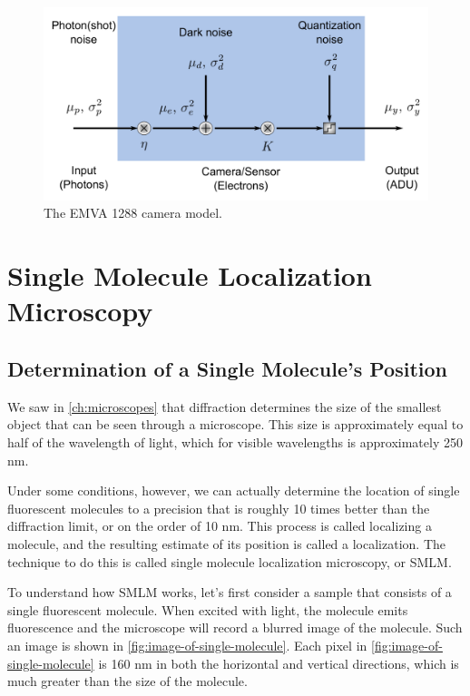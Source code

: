 \documentclass[10pt,a4paper,oneside]{book}
\begin{document}
\begin{figure}[ht]
    \centering
    \includegraphics[width=1.0\textwidth]{camera_noise_model.png}
    \caption{The EMVA 1288 camera model.}
    \label{fig:camera-model}
\end{figure}

\chapter{Single Molecule Localization Microscopy}

\section{Determination of a Single Molecule's Position}

We saw in \autoref{ch:microscopes} that diffraction determines the size of the smallest object that can be seen through a microscope. This size is approximately equal to half of the wavelength of light, which for visible wavelengths is approximately 250 nm.

Under some conditions, however, we can actually determine the location of single fluorescent molecules to a precision that is roughly 10 times better than the diffraction limit, or on the order of 10 nm. This process is called localizing a molecule, and the resulting estimate of its position is called a localization. The technique to do this is called single molecule localization microscopy, or SMLM.

To understand how SMLM works, let's first consider a sample that consists of a single fluorescent molecule. When excited with light, the molecule emits fluorescence and the microscope will record a blurred image of the molecule. Such an image is shown in \autoref{fig:image-of-single-molecule}. Each pixel in \autoref{fig:image-of-single-molecule} is 160 nm in both the horizontal and vertical directions, which is much greater than the size of the molecule.
\end{document}
